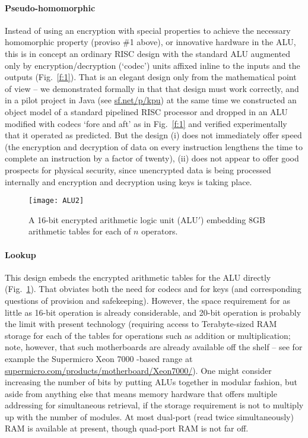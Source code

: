 \documentclass[conference]{IEEEtran}
\begin{document}
\paragraph{Pseudo-homomorphic \label{o:a}} Instead of using an
encryption with special properties to achieve the necessary homomorphic
property (proviso \#1 above), or innovative hardware in the ALU, this is
in concept an ordinary RISC \cite{Pat85} design with the standard ALU
augmented only by encryption/decryption (`codec') units affixed inline
to the inputs and the outputs (Fig.~\ref{f:1}).  That is an elegant
design only from the mathematical point of view -- we demonstrated
formally in \cite{BB13a} that that design must work correctly, and in a
pilot project in Java (see \url{sf.net/p/kpu}) at the same time we
constructed an object model of a standard pipelined RISC processor and
dropped in an ALU modified with codecs `fore and aft' as in
Fig.~\ref{f:1} and verified experimentally that it operated as
predicted.  But the design (i) does not immediately offer speed (the
encryption and decryption of data on every instruction lengthens the
time to complete an instruction by a factor of twenty), (ii) does not
appear to offer good prospects for physical security, since unencrypted
data is being processed internally and encryption and decryption using
keys is taking place.

\begin{figure}[!t]
\centering
\texttt{[image: ALU2]}
\caption{A 16-bit encrypted arithmetic logic unit (ALU$'$) embedding 
8GB arithmetic tables for each of $n$ operators.}
\label{f:2}
\end{figure}


\paragraph{Lookup}
This design embeds the encrypted arithmetic tables for the ALU
directly (Fig.~\ref{f:2}).  That obviates both
the need for codecs and for keys (and corresponding questions of
provision and safekeeping).  However, the space requirement for as
little as 16-bit operation is already considerable, and 20-bit operation
is probably the limit with present technology (requiring access to
Terabyte-sized RAM storage for each of the tables for operations such as
addition or multiplication; note, however, that such motherboards
are already available off the shelf -- see for example the
Supermicro Xeon 7000 -based range at
\url{supermicro.com/products/motherboard/Xeon7000/}).  One might
consider increasing the number of bits by putting ALUs together in
modular fashion, but aside from anything else that means memory hardware
that offers multiple addressing for simultaneous retrieval, if the
storage requirement is not to multiply up with the number of modules.
At most dual-port (read twice simultaneously) RAM is available at
present, though quad-port RAM is not far off.
\end{document}
